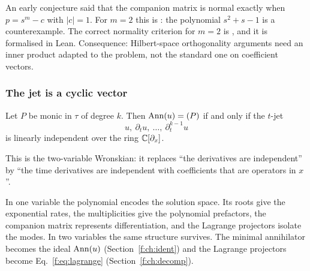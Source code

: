 \begin{caution}[title={The companion matrix is not normal in general}]
An early conjecture said that the companion matrix is normal exactly when $p=s^m-c$ with $|c|=1$. For $m=2$ this is \falsest: the polynomial $s^2+s-1$ is a counterexample. The correct normality criterion for $m=2$ is  \proved{}, and it is formalised in Lean. Consequence: Hilbert-space orthogonality arguments need an inner product adapted to the problem, not the standard one on coefficient vectors.
\end{caution}

\subsubsection{The jet is a cyclic vector}

\begin{proposition}\label{prop:cyclic}
Let $P$ be monic in $\tau$ of degree $k$. Then $\operatorname{Ann}(u)=(P)$ if and only if the $t$-jet
\[
u,\ \partial_tu,\ \dots,\ \partial_t^{k-1}u
\]
is linearly independent over the ring $\mathbb{C}[\partial_x]$.

\end{proposition}

This is the two-variable Wronskian: it replaces ``the derivatives are independent'' by ``the time derivatives are independent with coefficients that are operators in $x$''.

\begin{keypoint}
In one variable the polynomial encodes the solution space. Its roots give the exponential rates, the multiplicities give the polynomial prefactors, the companion matrix represents differentiation, and the Lagrange projectors isolate the modes. In two variables the same structure survives. The minimal annihilator becomes the ideal $\operatorname{Ann}(u)$ (Section~\ref{f:ch:ident}) and the Lagrange projectors become Eq.~\eqref{f:eq:lagrange} (Section~\ref{f:ch:decomp}).
\end{keypoint}

